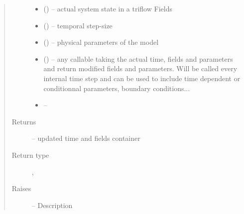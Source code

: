 \documentclass[letterpaper,10pt,english]{sphinxmanual}
\begin{document}
\begin{fulllineitems}
\begin{fulllineitems}
\begin{quote}
\begin{description}
\begin{itemize}
\item {} 
 () -- actual system state in a triflow Fields

\item {} 
 () -- temporal step-size

\item {} 
 () -- physical parameters of the model

\item {} 
 (\sphinxstyleliteralemphasis{, }) -- any callable taking the actual time, fields and parameters and return modified fields and parameters. Will be called every internal time step and can be used to include time dependent or conditionnal parameters, boundary conditions...

\item {} 
 -- 

\end{itemize}

\item[{Returns}] \leavevmode
{} -- updated time and fields container

\item[{Return type}] \leavevmode
{\hyperref[\detokenize{triflow.core:triflow.core.simulation.Simulation.t}]{}}, {\hyperref[\detokenize{triflow.core:module-triflow.core.fields}]{}}

\item[{Raises}] \leavevmode
{} -- Description

\end{description}\end{quote}

\end{fulllineitems}


\end{fulllineitems}
\end{document}
